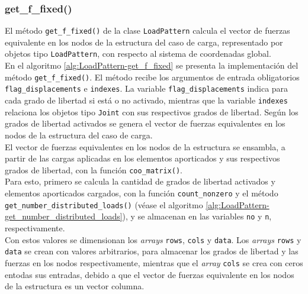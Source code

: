 \subsubsection{get\_f\_fixed()}

El método \verb|get_f_fixed()| de la clase \verb|LoadPattern| calcula el vector de fuerzas equivalente en los nodos de la estructura del caso de carga, representado por objetos tipo \verb|LoadPattern|, con respecto al sistema de coordenadas global.\\

En el algoritmo \ref{alg:LoadPattern-get_f_fixed} se presenta la implementación del método \verb|get_f_fixed()|. El método recibe los argumentos de entrada obligatorios \verb|flag_displacements| e \verb|indexes|. La variable \verb|flag_displacements| indica para cada grado de libertad si está o no activado, mientras que la variable \verb|indexes| relaciona los objetos tipo \verb|Joint| con sus respectivos grados de libertad. Según los grados de libertad activados se genera el vector de fuerzas equivalentes en los nodos de la estructura del caso de carga.\\

El vector de fuerzas equivalentes en los nodos de la estructura se ensambla, a partir de las cargas aplicadas en los elementos aporticados y sus respectivos grados de libertad, con la función \verb|coo_matrix()|.\\

Para esto, primero se calcula la cantidad de grados de libertad activados y elementos aporticados cargados, con la función \verb|count_nonzero| y el método \verb|get_number_distributed_loads()| (véase el algoritmo \ref{alg:LoadPattern-get_number_distributed_loads}), y se almacenan en las variables \verb|no| y \verb|n|, respectivamente.\\

Con estos valores se dimensionan los \emph{arrays} \verb|rows|, \verb|cols| y \verb|data|. Los \emph{arrays} \verb|rows| y \verb|data| se crean con valores arbitrarios, para almacenar los grados de libertad y las fuerzas en los nodos respectivamente, mientras que el \emph{array} \verb|cols| se crea con ceros entodas sus entradas, debido a que el vector de fuerzas equivalente en los nodos de la estructura es un vector columna.\\

